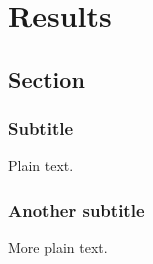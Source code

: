 
\chapter{Results}

\section{Section}

\subsection{Subtitle}

Plain text.

\subsection{Another subtitle}

More plain text.
